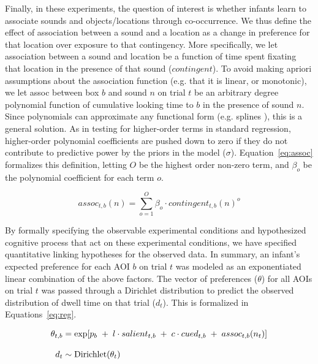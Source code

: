 \documentclass[12pt]{article}
\begin{document}
	Finally, in these experiments, the question of interest is whether infants learn to associate sounds and objects/locations through co-occurrence. We thus define the effect of association between a sound and a location as a change in preference for that location over exposure to that contingency. More specifically, we let association between a sound and location be a function of time spent fixating that location in the presence of that sound ($contingent$). To avoid making apriori assumptions about the association function (e.g. that it is linear, or monotonic), we let assoc between box $b$ and sound $n$ on trial $t$ be an arbitrary degree polynomial function of cumulative looking time to $b$ in the presence of sound $n$. Since polynomials can approximate any functional form (e.g. splines \cite{Barr2008, Jackson2009}), this is a general solution. As in testing for higher-order terms in standard regression, higher-order polynomial coefficients are pushed down to zero if they do not contribute to predictive power by the priors in the model ($\sigma$). Equation~\ref{eq:assoc} formalizes this definition, letting $O$ be the highest order non-zero term, and $\beta_{o}$ be the polynomial coefficient for each term $o$.

\begin{equation}\label{eq:assoc}
assoc_{t,b}(n) = \sum_{o=1}^{O} \beta_{o} \cdot contingent_{t,b}(n)^o
\end{equation}

	By formally specifying the observable experimental conditions and hypothesized cognitive process that act on these experimental conditions, we have specified quantitative linking hypotheses for the observed data. In summary, an infant's expected preference for each AOI $b$ on trial $t$ was modeled as an exponentiated linear combination of the above factors. The vector of preferences ($\theta$) for all AOIs on trial $t$ was passed through a Dirichlet distribution to predict the observed distribution of dwell time on that trial ($d_{t}$). This is formalized in Equations~\ref{eq:reg}.

\begin{equation}\label{eq:reg}
\setlength{\jot}{12pt}
\begin{aligned}
\theta_{t,b} &= \text{exp}[p_{b}\; + \; l \cdot salient_{t,b}\; + \; c \cdot cued_{t,b}\; + \; assoc_{t,b}(n_{t})]\\
d_{t} &\sim  \text{Dirichlet}(\theta_{t})
\end{aligned}
\end{equation}
\end{document}
